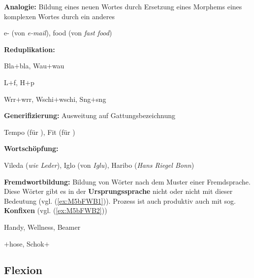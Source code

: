 \begin{frame}



\textbf{Analogie:} Bildung eines neuen Wortes durch Ersetzung eines Morphems eines komplexen Wortes durch ein anderes

\ea e- (von \emph{e-mail}),  food (von \emph{fast food})
\z


\medskip
\pause 


\textbf{Reduplikation:}

\settowidth{} 
\ea Bla$+$bla, Wau$+$wau 

\ex L$+$f, H$+$p \jambox{[Reimdopplung]}

\ex Wrr$+$wrr, Wschi$+$wschi, Sng$+$sng  \jambox{[Ablautdopplung]}
\z

\end{frame}


\begin{frame}


\textbf{Generifizierung:} Ausweitung auf Gattungsbezeichnung

\ea Tempo (für ), Fit (für )%
\z


\medskip
\pause 


\textbf{Wortschöpfung:}

\ea Vileda (\emph{wie Leder}), Iglo (von \emph{Iglu}), Haribo (\emph{Hans Riegel Bonn})
\z


\medskip
\pause 


\textbf{Fremdwortbildung:} Bildung von Wörter nach dem Muster einer Fremdsprache. Diese Wörter gibt es in der \textbf{Ursprungssprache} nicht oder nicht mit dieser Bedeutung (vgl. (\ref{ex:M5bFWB1})). Prozess ist auch produktiv auch mit sog. \textbf{Konfixen} (vgl. (\ref{ex:M5bFWB2}))

\ea\label{ex:M5bFWB1} Handy, Wellness, Beamer

\ex\label{ex:M5bFWB2} $+$hose, Schok$+$
\z

\end{frame}

\subsection{Flexion}


